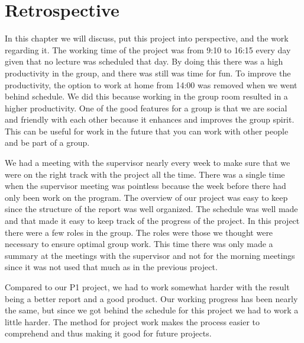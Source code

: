 \chapter{Retrospective}
In this chapter we will discuss, put this project into perspective, and the work regarding it.
The working time of the project was from 9:10 to 16:15 every day given that no lecture was scheduled that day. By doing this there was a high productivity in the group, and there was still was time for fun. To improve the productivity, the option to work at home from 14:00 was removed when we went behind schedule.
We did this because working in the group room resulted in a higher productivity. One of the good features for a group is that we are social and friendly with each other because it enhances and improves the group spirit. This can be useful for work in the future that you can work with other people and be part of a group.

We had a meeting with the supervisor nearly every week to make sure that we were on the right track with the project all the time. There was a single time when the supervisor meeting was pointless because the week before there had only been work on the program. The overview of our project was easy to keep since the structure of the report was well organized. The schedule was well made and that made it easy to keep track of the progress of the project. In this project there were a few roles in the group. The roles were those we thought were necessary to ensure optimal group work. This time there was only made a summary at the meetings with the supervisor and not for the morning meetings since it was not used that much as in the previous project. 

Compared to our P1 project, we had to work somewhat harder with the result being a better report and a good product. Our working progress has been nearly the same, but since we got behind the schedule for this project we had to work a little harder. The method for project work makes the process easier to comprehend and thus making it good for future projects.